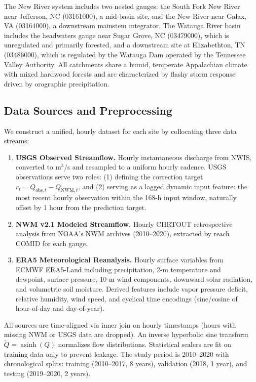 \documentclass[draft]{agujournal2019}
\begin{document}
The New River system includes two nested gauges: the South Fork New River near Jefferson, NC (03161000), a mid-basin site, and the New River near Galax, VA (03164000), a downstream mainstem integrator. The Watauga River basin includes the headwaters gauge near Sugar Grove, NC (03479000), which is unregulated and primarily forested, and a downstream site at Elizabethton, TN (03486000), which is regulated by the Watauga Dam operated by the Tennessee Valley Authority. All catchments share a humid, temperate Appalachian climate with mixed hardwood forests and are characterized by flashy storm response driven by orographic precipitation.

\subsection{Data Sources and Preprocessing}

We construct a unified, hourly dataset for each site by collocating three data streams:

\begin{enumerate}
    \item \textbf{USGS Observed Streamflow.} Hourly instantaneous discharge from NWIS, converted to m$^{3}$/s and resampled to a uniform hourly cadence. USGS observations serve two roles: (1) defining the correction target $r_t = Q_{\text{obs},t} - Q_{\text{NWM},t}$, and (2) serving as a lagged dynamic input feature: the most recent hourly observation within the 168-h input window, naturally offset by 1 hour from the prediction target.
    \item \textbf{NWM v2.1 Modeled Streamflow.} Hourly CHRTOUT retrospective analysis from NOAA's NWM archives (2010--2020), extracted by reach COMID for each gauge.
    \item \textbf{ERA5 Meteorological Reanalysis.} Hourly surface variables from ECMWF ERA5-Land \cite{hersbach2020} including precipitation, 2-m temperature and dewpoint, surface pressure, 10-m wind components, downward solar radiation, and volumetric soil moisture. Derived features include vapor pressure deficit, relative humidity, wind speed, and cyclical time encodings (sine/cosine of hour-of-day and day-of-year).
\end{enumerate}

All sources are time-aligned via inner join on hourly timestamps (hours with missing NWM or USGS data are dropped). An inverse hyperbolic sine transform $\tilde{Q} = \operatorname{asinh}(Q)$ normalizes flow distributions. Statistical scalers are fit on training data only to prevent leakage. The study period is 2010--2020 with chronological splits: training (2010--2017, 8 years), validation (2018, 1 year), and testing (2019--2020, 2 years).
\end{document}

